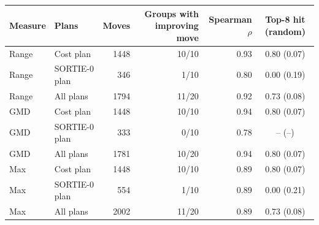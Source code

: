 \begin{tabular}{llrrrc}
\toprule
Measure & Plans & Moves & Groups with improving move & Spearman $\rho$ & Top-8 hit (random) \\
\midrule
Range & Cost plan & 1448 & 10/10 & 0.93 & 0.80 (0.07) \\
Range & SORTIE-0 plan & 346 & 1/10 & 0.80 & 0.00 (0.19) \\
Range & All plans & 1794 & 11/20 & 0.92 & 0.73 (0.08) \\
GMD & Cost plan & 1448 & 10/10 & 0.94 & 0.80 (0.07) \\
GMD & SORTIE-0 plan & 333 & 0/10 & 0.78 & -- (--) \\
GMD & All plans & 1781 & 10/20 & 0.94 & 0.80 (0.07) \\
Max & Cost plan & 1448 & 10/10 & 0.89 & 0.80 (0.07) \\
Max & SORTIE-0 plan & 554 & 1/10 & 0.89 & 0.00 (0.21) \\
Max & All plans & 2002 & 11/20 & 0.89 & 0.73 (0.08) \\
\bottomrule
\end{tabular}
